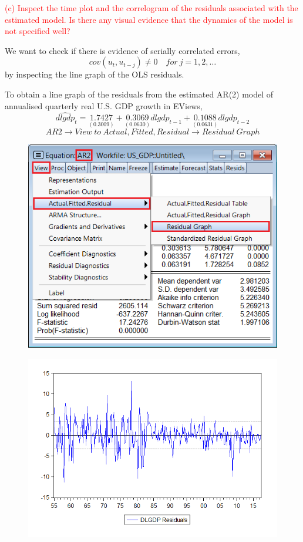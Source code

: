 \documentclass[12pt]{report}
\begin{document}
\newpage
\justify \noindent \textcolor{red}{(c) Inspect the time plot and the correlogram of the residuals associated with the estimated model. Is there any visual evidence that the dynamics of the model is not specified well?}

\noindent We want to check if there is evidence of serially correlated errors, $$cov(u_t, u_{t-j}) \neq 0 \quad for\ j=1,2,\dots$$ by inspecting the line graph of the OLS residuals. 

\noindent To obtain a line graph of the residuals from the estimated AR(2) model of annualised quarterly real U.S. GDP growth in EViews, $$\widehat{dlgdp}_t = \underset{(0.3009)}{1.7427} + \underset{(0.0630)}{0.3069}dlgdp_{t-1} + \underset{(0.0631)}{0.1088}dlgdp_{t-2}$$
$$AR2 \to View\ to\ Actual,Fitted,Residual \to Residual\ Graph$$
\begin{figure}[H]
	\centerline{\includegraphics{tute11_5}}
\end{figure}
\vspace{-\baselineskip}
\begin{figure}[H]
	\centerline{\includegraphics{tute11_6}}
\end{figure}
\end{document}
